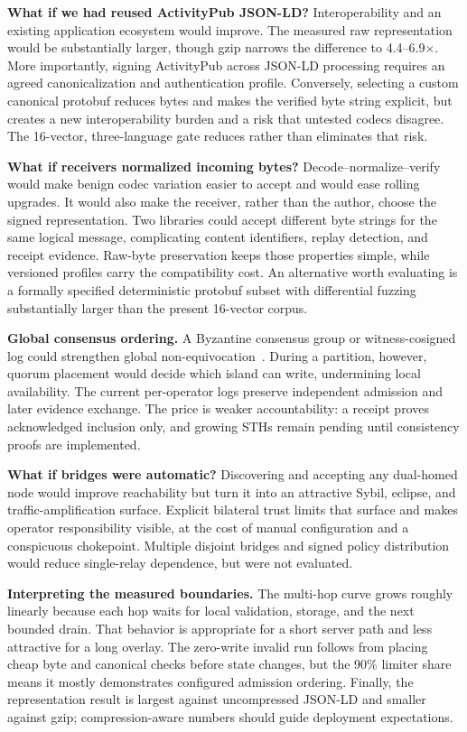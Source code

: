 \documentclass[sigconf,anonymous]{acmart}
\begin{document}
\textbf{What if we had reused ActivityPub JSON-LD?} Interoperability and an existing application
ecosystem would improve. The measured raw representation would be substantially larger, though gzip
narrows the difference to 4.4--6.9$\times$. More importantly, signing ActivityPub across JSON-LD
processing requires an agreed canonicalization and authentication profile. Conversely, selecting a
custom canonical protobuf reduces bytes and makes the verified byte string explicit, but creates a
new interoperability burden and a risk that untested codecs disagree. The 16-vector, three-language
gate reduces rather than eliminates that risk.

\textbf{What if receivers normalized incoming bytes?} Decode--normalize--verify would make benign
codec variation easier to accept and would ease rolling upgrades. It would also make the receiver,
rather than the author, choose the signed representation. Two libraries could accept different byte
strings for the same logical message, complicating content identifiers, replay detection, and receipt
evidence. Raw-byte preservation keeps those properties simple, while versioned profiles carry the
compatibility cost. An alternative worth evaluating is a formally specified deterministic protobuf
subset with differential fuzzing substantially larger than the present 16-vector corpus.

\textbf{Global consensus ordering.} A Byzantine consensus group or
witness-cosigned log could strengthen global non-equivocation~\cite{syta2016cosi}. During a partition,
however, quorum placement would decide which island can write, undermining local availability. The
current per-operator logs preserve independent admission and later evidence exchange. The price is
weaker accountability: a receipt proves acknowledged inclusion only, and growing STHs remain pending
until consistency proofs are implemented.

\textbf{What if bridges were automatic?} Discovering and accepting any dual-homed node would improve
reachability but turn it into an attractive Sybil, eclipse, and traffic-amplification surface.
Explicit bilateral trust limits that surface and makes operator responsibility visible, at the cost
of manual configuration and a conspicuous chokepoint. Multiple disjoint bridges and signed policy
distribution would reduce single-relay dependence, but were not evaluated.

\textbf{Interpreting the measured boundaries.} The multi-hop curve grows roughly linearly because
each hop waits for local validation, storage, and the next bounded drain. That behavior is appropriate
for a short server path and less attractive for a long overlay. The zero-write invalid run follows
from placing cheap byte and canonical checks before state changes, but the 90\% limiter share means it
mostly demonstrates configured admission ordering. Finally, the representation result is largest
against uncompressed JSON-LD and smaller against gzip; compression-aware numbers should guide
deployment expectations.
\end{document}
